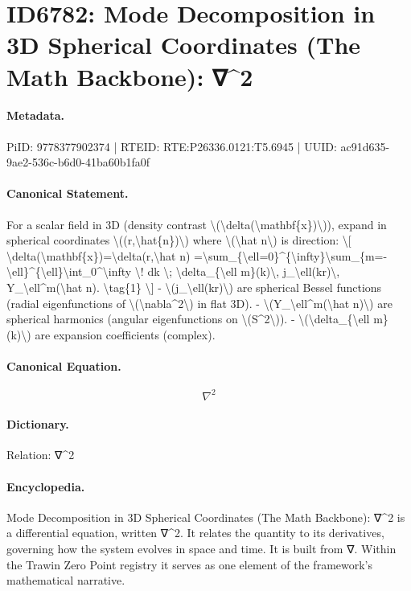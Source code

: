 \section*{ID6782: Mode Decomposition in 3D Spherical Coordinates (The Math Backbone): ∇\textasciicircum{}2}
\paragraph{Metadata.}
PiID: 9778377902374 | RTEID: RTE:P26336.0121:T5.6945 | UUID: ac91d635-9ae2-536c-b6d0-41ba60b1fa0f

\paragraph{Canonical Statement.}
For a scalar field in 3D (density contrast \textbackslash{}(\textbackslash{}delta(\textbackslash{}mathbf\{x\})\textbackslash{})), expand in spherical coordinates \textbackslash{}((r,\textbackslash{}hat\{n\})\textbackslash{}) where \textbackslash{}(\textbackslash{}hat n\textbackslash{}) is direction: \textbackslash{}[ \textbackslash{}delta(\textbackslash{}mathbf\{x\})=\textbackslash{}delta(r,\textbackslash{}hat n) =\textbackslash{}sum\_\{\textbackslash{}ell=0\}\textasciicircum{}\{\textbackslash{}infty\}\textbackslash{}sum\_\{m=-\textbackslash{}ell\}\textasciicircum{}\{\textbackslash{}ell\}\textbackslash{}int\_0\textasciicircum{}\textbackslash{}infty \textbackslash{}! dk \textbackslash{}; \textbackslash{}delta\_\{\textbackslash{}ell m\}(k)\textbackslash{}, j\_\textbackslash{}ell(kr)\textbackslash{}, Y\_\textbackslash{}ell\textasciicircum{}m(\textbackslash{}hat n). \textbackslash{}tag\{1\} \textbackslash{}] - \textbackslash{}(j\_\textbackslash{}ell(kr)\textbackslash{}) are spherical Bessel functions (radial eigenfunctions of \textbackslash{}(\textbackslash{}nabla\textasciicircum{}2\textbackslash{}) in flat 3D). - \textbackslash{}(Y\_\textbackslash{}ell\textasciicircum{}m(\textbackslash{}hat n)\textbackslash{}) are spherical harmonics (angular eigenfunctions on \textbackslash{}(S\textasciicircum{}2\textbackslash{})). - \textbackslash{}(\textbackslash{}delta\_\{\textbackslash{}ell m\}(k)\textbackslash{}) are expansion coefficients (complex).

\paragraph{Canonical Equation.}
\[
\nabla^2
\]

\paragraph{Dictionary.}
Relation: ∇\textasciicircum{}2

\paragraph{Encyclopedia.}
Mode Decomposition in 3D Spherical Coordinates (The Math Backbone): ∇\textasciicircum{}2 is a differential equation, written ∇\textasciicircum{}2. It relates the quantity to its derivatives, governing how the system evolves in space and time. It is built from ∇. Within the Trawin Zero Point registry it serves as one element of the framework's mathematical narrative.
